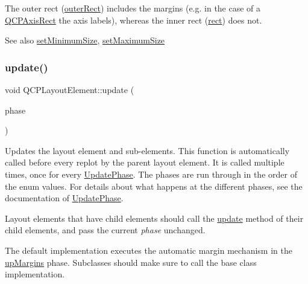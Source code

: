 The outer rect (\hyperlink{classQCPLayoutElement_a2a32a12a6161c9dffbadeb9cc585510c}{outer\+Rect}) includes the margins (e.\+g. in the case of a \hyperlink{classQCPAxisRect}{Q\+C\+P\+Axis\+Rect} the axis labels), whereas the inner rect (\hyperlink{classQCPLayoutElement_a208effccfe2cca4a0eaf9393e60f2dd4}{rect}) does not.

\begin{DoxySeeAlso}{See also}
\hyperlink{classQCPLayoutElement_a5dd29a3c8bc88440c97c06b67be7886b}{set\+Minimum\+Size}, \hyperlink{classQCPLayoutElement_a74eb5280a737ab44833d506db65efd95}{set\+Maximum\+Size} 
\end{DoxySeeAlso}
\mbox{\label{classQCPLayoutElement_a929c2ec62e0e0e1d8418eaa802e2af9b}} 
\subsubsection{\texorpdfstring{update()}{update()}}
{\footnotesize\ttfamily void Q\+C\+P\+Layout\+Element\+::update (\begin{DoxyParamCaption}\item[{\hyperlink{classQCPLayoutElement_a0d83360e05735735aaf6d7983c56374d}{Update\+Phase}}]{phase }\end{DoxyParamCaption})\hspace{0.3cm}{\ttfamily [virtual]}}

Updates the layout element and sub-\/elements. This function is automatically called before every replot by the parent layout element. It is called multiple times, once for every \hyperlink{classQCPLayoutElement_a0d83360e05735735aaf6d7983c56374d}{Update\+Phase}. The phases are run through in the order of the enum values. For details about what happens at the different phases, see the documentation of \hyperlink{classQCPLayoutElement_a0d83360e05735735aaf6d7983c56374d}{Update\+Phase}.

Layout elements that have child elements should call the \hyperlink{classQCPLayoutElement_a929c2ec62e0e0e1d8418eaa802e2af9b}{update} method of their child elements, and pass the current {\itshape phase} unchanged.

The default implementation executes the automatic margin mechanism in the \hyperlink{classQCPLayoutElement_a0d83360e05735735aaf6d7983c56374da288cb59a92280e47261a341f2813e676}{up\+Margins} phase. Subclasses should make sure to call the base class implementation. 

